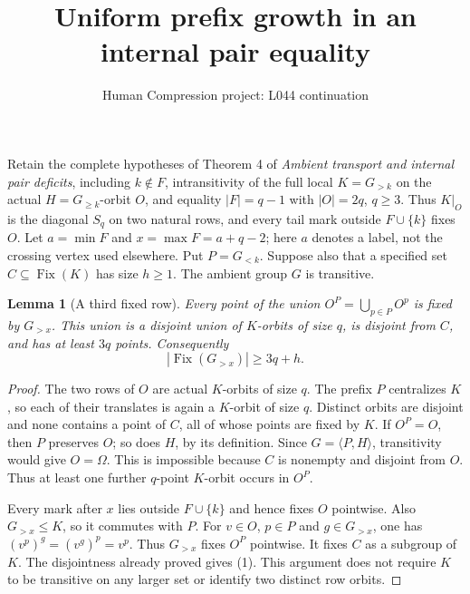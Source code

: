 \documentclass[11pt,a4paper]{article}
\title{Uniform prefix growth in an internal pair equality}
\author{Human Compression project: L044 continuation}
\date{}
\newtheorem{lemma}{Lemma}
\newcommand{\gen}[1]{\langle#1\rangle}
\begin{document}
\maketitle
Retain the complete hypotheses of Theorem 4 of
\emph{Ambient transport and internal pair deficits}, including
$k\notin F$, intransitivity of the full local $K=G_{>k}$ on the
actual $H=G_{\ge k}$-orbit $O$, and equality $|F|=q-1$ with
$|O|=2q$, $q\ge3$. Thus $K|_O$ is the diagonal $S_q$ on two
natural rows, and every tail mark outside $F\cup\{k\}$ fixes $O$.
Let $a=\min F$ and $x=\max F=a+q-2$; here $a$ denotes a label,
not the crossing vertex used elsewhere. Put $P=G_{<k}$.
Suppose also that a specified set $C\subseteq\operatorname{Fix}(K)$
has size $h\ge1$. The ambient group $G$ is transitive.

\begin{lemma}[A third fixed row]\label{rows}
Every point of the union $O^P=\bigcup_{p\in P}O^p$ is fixed by
$G_{>x}$. This union is a disjoint union of $K$-orbits of size $q$,
is disjoint from $C$, and has at least $3q$ points. Consequently
\[
                |\operatorname{Fix}(G_{>x})|\ge 3q+h.    \tag{1}
\]
\end{lemma}
\begin{proof}
The two rows of $O$ are actual $K$-orbits of size $q$.
The prefix $P$ centralizes $K$, so each of their translates is
again a $K$-orbit of size $q$. Distinct orbits are disjoint and
none contains a point of $C$, all of whose points are fixed by $K$.
If $O^P=O$, then $P$ preserves $O$; so does $H$, by its definition.
Since $G=\gen{P,H}$, transitivity would give $O=\Omega$.
This is impossible because $C$ is nonempty and disjoint from $O$.
Thus at least one further $q$-point $K$-orbit occurs in $O^P$.

Every mark after $x$ lies outside $F\cup\{k\}$ and hence fixes
$O$ pointwise. Also $G_{>x}\le K$, so it commutes with $P$.
For $v\in O$, $p\in P$ and $g\in G_{>x}$, one has
$(v^p)^g=(v^g)^p=v^p$. Thus $G_{>x}$ fixes $O^P$ pointwise.
It fixes $C$ as a subgroup of $K$. The disjointness already proved
gives (1). This argument does not require $K$ to be transitive
on any larger set or identify two distinct row orbits.
\end{proof}
\end{document}
